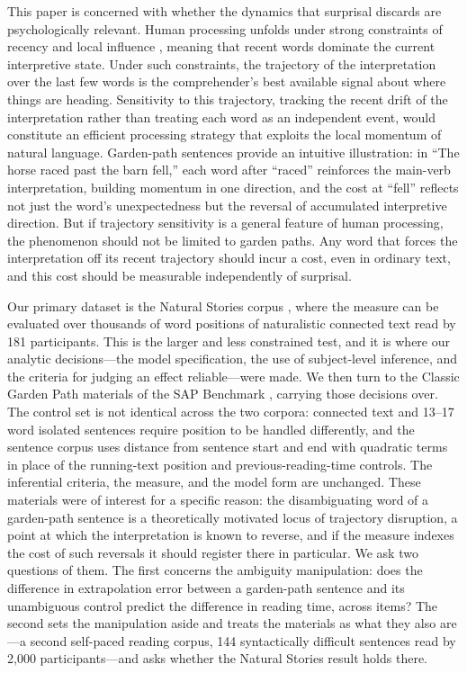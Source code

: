 \documentclass[12pt]{article}
\newcommand{\new}[1]{#1}   %
\begin{document}
\new{This paper is concerned with whether the dynamics that surprisal discards are psychologically relevant.} Human processing unfolds under strong constraints of recency and local influence \citep{gibson1998,lewis2005}, meaning that recent words dominate the current interpretive state. Under such constraints, the trajectory of the interpretation over the last few words is the comprehender's best available signal about where things are heading. Sensitivity to this trajectory, tracking the recent drift of the interpretation rather than treating each word as an independent event, would constitute an efficient processing strategy that exploits the local momentum of natural language. Garden-path sentences provide an intuitive illustration: in ``The horse raced past the barn fell,'' each word after ``raced'' reinforces the main-verb interpretation, building momentum in one direction, and the cost at ``fell'' reflects not just the word's unexpectedness but the reversal of accumulated interpretive direction. But if trajectory sensitivity is a general feature of human processing, the phenomenon should not be limited to garden paths. Any word that forces the interpretation off its recent trajectory should incur a cost, even in ordinary text, and this cost should be measurable independently of surprisal.


\new{Our primary dataset is the Natural Stories corpus \citep{futrell2018}, where the measure can be evaluated over thousands of word positions of naturalistic connected text read by 181 participants. This is the larger and less constrained test, and it is where our analytic decisions---the model specification, the use of subject-level inference, and the criteria for judging an effect reliable---were made. We then turn to the Classic Garden Path materials of the SAP Benchmark \citep{huang2024}, carrying those decisions over. The control set is not identical across the two corpora: connected text and 13--17 word isolated sentences require position to be handled differently, and the sentence corpus uses distance from sentence start and end with quadratic terms in place of the running-text position and previous-reading-time controls. The inferential criteria, the measure, and the model form are unchanged. These materials were of interest for a specific reason: the disambiguating word of a garden-path sentence is a theoretically motivated locus of trajectory disruption, a point at which the interpretation is known to reverse, and if the measure indexes the cost of such reversals it should register there in particular. We ask two questions of them. The first concerns the ambiguity manipulation: does the difference in extrapolation error between a garden-path sentence and its unambiguous control predict the difference in reading time, across items? The second sets the manipulation aside and treats the materials as what they also are---a second self-paced reading corpus, 144 syntactically difficult sentences read by 2,000 participants---and asks whether the Natural Stories result holds there.}
\end{document}
